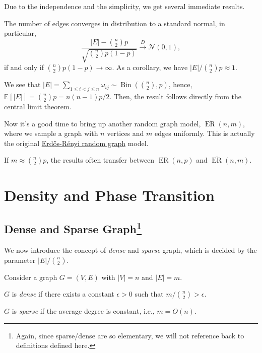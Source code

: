 Due to the independence and the simplicity, we get several immediate results.

\begin{claim}
	The number of edges converges in distribution to a standard normal, in particular,
	\[
		\frac{\lvert E \rvert - \binom{n}{2}p}{\sqrt{\binom{n}{2}p (1 - p)} }
		\overset{D}{\to } \mathcal{N} (0, 1),
	\]
	if and only if \(\binom{n}{2}p (1 - p) \to \infty \). As a corollary, we have \(\lvert E \rvert / \binom{n}{2}p \approx 1\).
\end{claim}
\begin{explanation}
	We see that \(\lvert E \rvert = \sum_{1 \leq i < j \leq n} \omega _{ij} \sim \operatorname{Bin}(\binom{n}{2}, p) \), hence, \(\mathbb{E}_{}[\lvert E \rvert ] = \binom{n}{2}p = n(n-1) p / 2\). Then, the result follows directly from the central limit theorem.
\end{explanation}

Now it's a good time to bring up another random graph model, \(\overline{\operatorname{ER}} (n, m)\), where we sample a graph with \(n\) vertices and \(m\) edges uniformly. This is actually the original \hyperref[def:Erdős-Rényi-random-graph]{Erdős-Rényi random graph} model.

\begin{remark}
	If \(m \approx \binom{n}{2}p\), the results often transfer between \(\operatorname{ER}(n, p)\) and \(\overline{\operatorname{ER}} (n, m)\).
\end{remark}

\section{Density and Phase Transition}
\subsection{Dense and Sparse Graph\protect\footnote{Again, since sparse/dense are so elementary, we will not reference back to definitions defined here.}}
We now introduce the concept of \emph{dense} and \emph{sparse} graph, which is decided by the parameter \(\lvert E \rvert / \binom{n}{2} \).

\begin{definition*}
	Consider a graph \(G = (V, E)\) with \(\lvert V \rvert = n\) and \(\lvert E \rvert = m\).
	\begin{definition}\label{def:dense-graph}
		\(G\) is \emph{dense} if there exists a constant \(\epsilon > 0\) such that \(m / \binom{n}{2} > \epsilon \).
	\end{definition}

	\begin{definition}\label{def:sparse-graph}
		\(G\) is \emph{sparse} if the average degree is constant, i.e., \(m = O(n)\).
	\end{definition}
\end{definition*}

